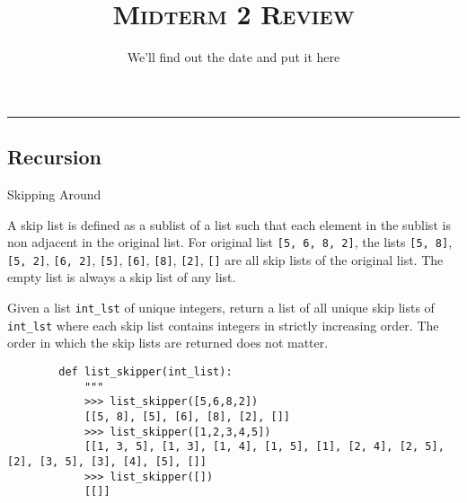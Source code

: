 \documentclass{exam}
\title{\textsc{Midterm 2 Review}}
\date{We'll find out the date and put it here }
\begin{document}
	\maketitle
	\rule{\textwidth}{0.15em}
	\fontsize{12}{15}\selectfont

\begin{questions}

\begin{blocksection}
\section{Recursion}
	\question Skipping Around
    \begin{blocksection}
        A skip list is defined as a sublist of a list such that each element in the sublist is non adjacent in the
        original list. For original list \lstinline{[5, 6, 8, 2]}, the lists \lstinline{[5, 8]}, \lstinline{[5, 2]}, \lstinline{[6, 2]}, \lstinline{[5]}, \lstinline{[6]}, \lstinline{[8]}, \lstinline{[2]}, \lstinline{[]} are
        all skip lists of the original list. The empty list is always a skip list of any list.

        Given a list \lstinline{int_lst} of unique integers, return a list of all unique skip lists of \lstinline{int_lst} where each skip
        list contains integers in strictly increasing order. The order in which the skip lists are returned does not matter.
        
        \begin{lstlisting}
        def list_skipper(int_list):
            """
            >>> list_skipper([5,6,8,2])
            [[5, 8], [5], [6], [8], [2], []]
            >>> list_skipper([1,2,3,4,5])
            [[1, 3, 5], [1, 3], [1, 4], [1, 5], [1], [2, 4], [2, 5], [2], [3, 5], [3], [4], [5], []]
            >>> list_skipper([])
            [[]]


\end{lstlisting}
\end{blocksection}
\end{blocksection}
\end{questions}
\end{document}

